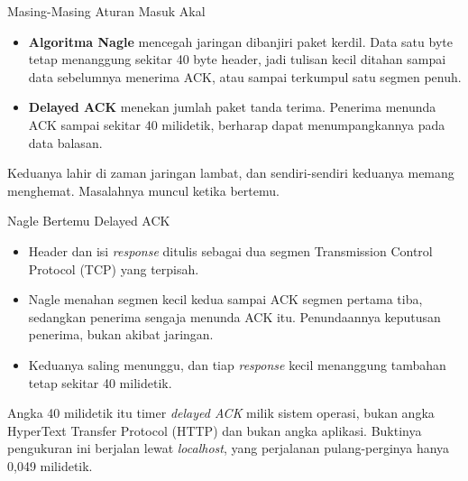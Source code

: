 \documentclass[aspectratio=169, table, 12pt]{beamer}
\begin{document}
\begin{frame}{{\Large Masing-Masing Aturan Masuk Akal}}
  \vspace{10pt}
  \begin{itemize}
    \item \textbf{Algoritma Nagle} mencegah jaringan dibanjiri paket kerdil.
          Data satu byte tetap menanggung sekitar 40 byte header, jadi
          tulisan kecil ditahan sampai data sebelumnya menerima ACK, atau
          sampai terkumpul satu segmen penuh.
    \item \textbf{Delayed ACK} menekan jumlah paket tanda terima. Penerima
          menunda ACK sampai sekitar 40 milidetik, berharap dapat
          menumpangkannya pada data balasan.
  \end{itemize}
  \vspace{8pt}
  {\small Keduanya lahir di zaman jaringan lambat, dan sendiri-sendiri
  keduanya memang menghemat. Masalahnya muncul ketika bertemu.}
\end{frame}

\begin{frame}{{\Large Nagle Bertemu Delayed ACK}}
  \vspace{10pt}
  \begin{itemize}
    \item Header dan isi \textit{response} ditulis sebagai dua segmen Transmission
          Control Protocol (TCP) yang terpisah.
    \item Nagle menahan segmen kecil kedua sampai ACK segmen pertama tiba,
          sedangkan penerima sengaja menunda ACK itu. Penundaannya keputusan
          penerima, bukan akibat jaringan.
    \item Keduanya saling menunggu, dan tiap \textit{response} kecil menanggung
          tambahan tetap sekitar 40 milidetik.
  \end{itemize}
  \vspace{8pt}
  {\small Angka 40 milidetik itu timer \textit{delayed ACK} milik sistem
  operasi, bukan angka HyperText Transfer Protocol (HTTP) dan bukan angka aplikasi. Buktinya pengukuran ini
  berjalan lewat \textit{localhost}, yang perjalanan pulang-perginya hanya
  0,049 milidetik.}
\end{frame}
\end{document}
